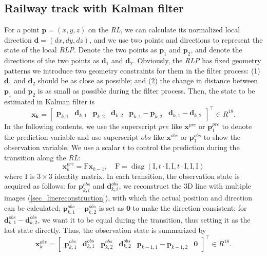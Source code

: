 \subsection{Railway track with Kalman filter}
For a point $\mathbf p=\left(x,y,z\right)$ on the \textit{RL}, 
we can calculate its normalized local direction $\mathbf d=\left(dx,dy,dz\right)$,
and we use  two points and directions to represent the state of the local \textit{RLP}.
Denote the two points as $\mathbf p_1$ and $\mathbf p_2$,  
and denote the directions of the two points as $\mathbf d_1$ and $\mathbf d_2$.
Obviously,
the \textit{RLP} has fixed geometry patterns
we introduce two geometry constraints for them in the filter process:
(1) $\mathbf d_1$ and $\mathbf d_2$ should be as close as possible;
and (2) the change in distance between $\mathbf p_1$ and $\mathbf p_2$ is as small as possible during the filter process.
Then,
the state to be estimated in Kalman filter is
\begin{equation}
\mathbf{x_k} = \begin{bmatrix}
    \mathbf p_{k,1} & \mathbf d_{k,1} & \mathbf p_{k,2} & \mathbf d_{k,2}  & \mathbf p_{k,1}-\mathbf p_{k,2} & \mathbf d_{k,1}-\mathbf d_{k,2}
\end{bmatrix}^ \top \in R^{18}.
\end{equation}
In the following contents,
we use the superscript $pre$ like $\mathbf{x}^{pre}$ or $\mathbf{p}_1^{pre}$  to denote the prediction variable
and use superscript $obs$ like $\mathbf{x}^{obs}$ or $\mathbf{p}_1^{obs}$  to show the observation variable.
We use a scalar $t$ to control the prediction during the transition along the \textit{RL}:
\begin{equation}
        \mathbf{x}^{pre}_k= 
        \mathrm F \mathbf{x}_{k-1}, \quad  
        \mathrm F=\operatorname{diag}\left(\mathrm I,t \! \cdot \! \mathrm I, \mathrm I, t \! \cdot \! \mathrm I, \mathrm I , \mathrm I\right)
        \label {eq_statetransition}
\end{equation}
where $\mathrm I$ is $3\times3$ identity matrix.
In each transition,
the observation state is acquired as follows:
for $\mathbf{p}_{k,i}^{obs}$ and $\mathbf{d}_{k,i}^{obs}$,
we reconstruct the 3D line with multiple images (\cref*{sec_linereconstruction}),
with which the actual position and direction can be calculated;
$\mathbf p_{k,1}^{obs}-\mathbf p_{k,2}^{obs}$ is set as $\mathbf 0$ to make the direction consistent;
for $\mathbf d_{k,1}^{obs}-\mathbf d_{k,2}^{obs}$,
we want it to be equal during the transition,
thus setting it as the last state directly.
Thus,
the observation state is summarized by
\begin{equation}
    \mathbf{x}^{obs}_k= 
    \begin{bmatrix}
        \mathbf p_{k,1}^{obs} & \mathbf d_{k,1}^{obs} & \mathbf p_{k,2}^{obs} & \mathbf d_{k,2}^{obs}
          &\mathbf p_{k-1,1}-\mathbf p_{k-1,2} & \mathbf 0
    \end{bmatrix}^ \top \in R^{18}.
    \label {eq_observation}
\end{equation}

